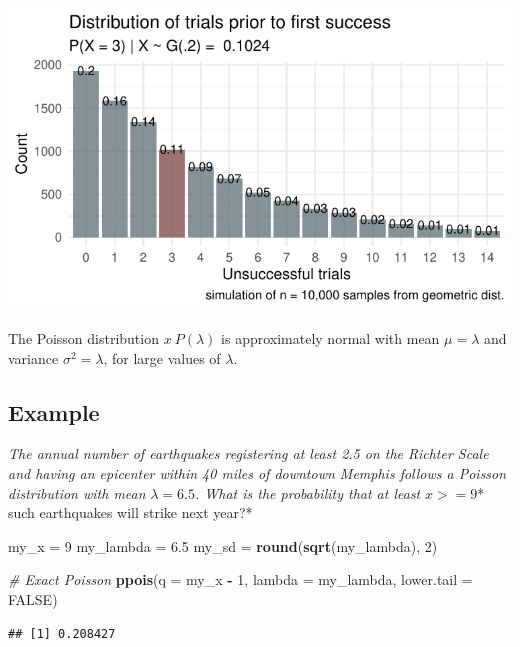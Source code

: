 \documentclass[]{book}
\newenvironment{Shaded}{\begin{snugshade}}{\end{snugshade}}
\newcommand{\CommentTok}[1]{\textcolor[rgb]{0.56,0.35,0.01}{\textit{#1}}}
\newcommand{\DataTypeTok}[1]{\textcolor[rgb]{0.13,0.29,0.53}{#1}}
\newcommand{\DecValTok}[1]{\textcolor[rgb]{0.00,0.00,0.81}{#1}}
\newcommand{\FloatTok}[1]{\textcolor[rgb]{0.00,0.00,0.81}{#1}}
\newcommand{\KeywordTok}[1]{\textcolor[rgb]{0.13,0.29,0.53}{\textbf{#1}}}
\newcommand{\NormalTok}[1]{#1}
\newcommand{\OperatorTok}[1]{\textcolor[rgb]{0.81,0.36,0.00}{\textbf{#1}}}
\newcommand{\OtherTok}[1]{\textcolor[rgb]{0.56,0.35,0.01}{#1}}
\newcommand{\StringTok}[1]{\textcolor[rgb]{0.31,0.60,0.02}{#1}}
\begin{document}
\includegraphics{data-sci_files/figure-latex/unnamed-chunk-17-1.pdf}

The Poisson distribution \(x~P(\lambda)\) is approximately normal with mean \(\mu = \lambda\) and variance \(\sigma^2 = \lambda\), for large values of \(\lambda\).

\hypertarget{example-5}{%
\subsection{Example}\label{example-5}}

\emph{The annual number of earthquakes registering at least 2.5 on the Richter Scale and having an epicenter within 40 miles of downtown Memphis follows a Poisson distribution with mean }\(\lambda=6.5\)\emph{. What is the probability that at least }\(x>=9\)* such earthquakes will strike next year?*

\begin{Shaded}
\begin{Highlighting}[]
\NormalTok{my_x =}\StringTok{ }\DecValTok{9}
\NormalTok{my_lambda =}\StringTok{ }\FloatTok{6.5}
\NormalTok{my_sd =}\StringTok{ }\KeywordTok{round}\NormalTok{(}\KeywordTok{sqrt}\NormalTok{(my_lambda), }\DecValTok{2}\NormalTok{)}

\CommentTok{# Exact Poisson}
\KeywordTok{ppois}\NormalTok{(}\DataTypeTok{q =}\NormalTok{ my_x }\OperatorTok{-}\StringTok{ }\DecValTok{1}\NormalTok{, }\DataTypeTok{lambda =}\NormalTok{ my_lambda, }\DataTypeTok{lower.tail =} \OtherTok{FALSE}\NormalTok{)}
\end{Highlighting}
\end{Shaded}

\begin{verbatim}
## [1] 0.208427
\end{verbatim}
\end{document}
